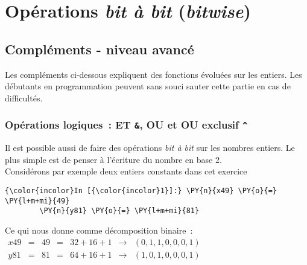     \hypertarget{opuxe9rations-bit-uxe0-bit-bitwise}{%
\section{\texorpdfstring{Opérations \emph{bit à bit}
(\emph{bitwise})}{Opérations bit à bit (bitwise)}}\label{opuxe9rations-bit-uxe0-bit-bitwise}}

    \hypertarget{compluxe9ments---niveau-avancuxe9}{%
\subsection{Compléments - niveau
avancé}\label{compluxe9ments---niveau-avancuxe9}}

    Les compléments ci-dessous expliquent des fonctions évoluées sur les
entiers. Les débutants en programmation peuvent sans souci sauter cette
partie en cas de difficultés.

    \hypertarget{opuxe9rations-logiques-et-ou-et-ou-exclusif}{%
\subsubsection{\texorpdfstring{Opérations logiques~: ET \texttt{\&}, OU
\texttt{\textbar{}} et OU exclusif
\texttt{\^{}}}{Opérations logiques~: ET \&, OU \textbar{} et OU exclusif \^{}}}\label{opuxe9rations-logiques-et-ou-et-ou-exclusif}}

    Il est possible aussi de faire des opérations \emph{bit à bit} sur les
nombres entiers. Le plus simple est de penser à l'écriture du nombre en
base 2.\\

Considérons par exemple deux entiers constants dans cet exercice

    \begin{Verbatim}[commandchars=\\\{\}]
{\color{incolor}In [{\color{incolor}1}]:} \PY{n}{x49} \PY{o}{=} \PY{l+m+mi}{49}
        \PY{n}{y81} \PY{o}{=} \PY{l+m+mi}{81}
\end{Verbatim}


    Ce qui nous donne comme décomposition binaire~:\\

\(\begin{array}{rcccccc} x49 & = & 49 & = & 32 + 16 + 1 & \rightarrow &(0,1,1,0,0,0,1) \\ y81 & = & 81 & = & 64 + 16 + 1 & \rightarrow &(1,0,1,0,0,0,1) \end{array}\)\\

